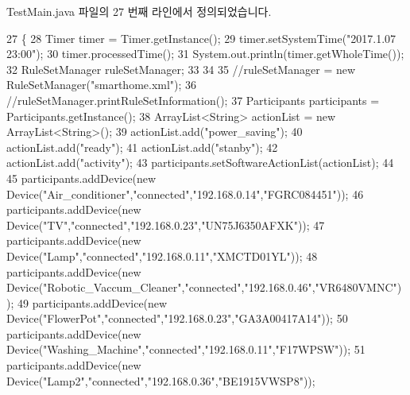 Test\+Main.\+java 파일의 27 번째 라인에서 정의되었습니다.


\begin{DoxyCode}
27                                            \{
28         Timer timer = Timer.getInstance();
29         timer.setSystemTime(\textcolor{stringliteral}{"2017.1.07 23:00"});
30         timer.processedTime();
31         System.out.println(timer.getWholeTime());
32         RuleSetManager ruleSetManager;  
33         
34     
35         \textcolor{comment}{//ruleSetManager = new RuleSetManager("smarthome.xml");}
36         \textcolor{comment}{//ruleSetManager.printRuleSetInformation(); }
37         Participants participants = Participants.getInstance();
38         ArrayList<String> actionList = \textcolor{keyword}{new} ArrayList<String>();
39         actionList.add(\textcolor{stringliteral}{"power\_saving"});
40         actionList.add(\textcolor{stringliteral}{"ready"});
41         actionList.add(\textcolor{stringliteral}{"stanby"});
42         actionList.add(\textcolor{stringliteral}{"activity"});
43         participants.setSoftwareActionList(actionList);
44             
45         participants.addDevice(\textcolor{keyword}{new} Device(\textcolor{stringliteral}{"Air\_conditioner"},\textcolor{stringliteral}{"connected"},\textcolor{stringliteral}{"192.168.0.14"},\textcolor{stringliteral}{"FGRC084451"}));
46         participants.addDevice(\textcolor{keyword}{new} Device(\textcolor{stringliteral}{"TV"},\textcolor{stringliteral}{"connected"},\textcolor{stringliteral}{"192.168.0.23"},\textcolor{stringliteral}{"UN75J6350AFXK"}));
47         participants.addDevice(\textcolor{keyword}{new} Device(\textcolor{stringliteral}{"Lamp"},\textcolor{stringliteral}{"connected"},\textcolor{stringliteral}{"192.168.0.11"},\textcolor{stringliteral}{"XMCTD01YL"}));
48         participants.addDevice(\textcolor{keyword}{new} Device(\textcolor{stringliteral}{"Robotic\_Vaccum\_Cleaner"},\textcolor{stringliteral}{"connected"},\textcolor{stringliteral}{"192.168.0.46"},\textcolor{stringliteral}{"VR6480VMNC"})
      );
49         participants.addDevice(\textcolor{keyword}{new} Device(\textcolor{stringliteral}{"FlowerPot"},\textcolor{stringliteral}{"connected"},\textcolor{stringliteral}{"192.168.0.23"},\textcolor{stringliteral}{"GA3A00417A14"}));
50         participants.addDevice(\textcolor{keyword}{new} Device(\textcolor{stringliteral}{"Washing\_Machine"},\textcolor{stringliteral}{"connected"},\textcolor{stringliteral}{"192.168.0.11"},\textcolor{stringliteral}{"F17WPSW"}));
51         participants.addDevice(\textcolor{keyword}{new} Device(\textcolor{stringliteral}{"Lamp2"},\textcolor{stringliteral}{"connected"},\textcolor{stringliteral}{"192.168.0.36"},\textcolor{stringliteral}{"BE1915VWSP8"}));

\end{DoxyCode}
